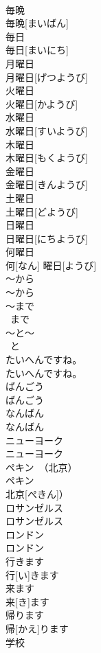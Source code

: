 \documentclass[8pt]{extreport}
\begin{document}
\begin{CJK}{UTF8}{min}
\\	毎晩	
\\	毎晩[まいばん]	
\\	毎日	
\\	毎日[まいにち]	
\\	月曜日	
\\	月曜日[げつようび]	
\\	火曜日	
\\	火曜日[かようび]	
\\	水曜日	
\\	水曜日[すいようび]	
\\	木曜日	
\\	木曜日[もくようび]	
\\	金曜日	
\\	金曜日[きんようび]	
\\	土曜日	
\\	土曜日[どようび]	
\\	日曜日	
\\	日曜日[にちようび]	
\\	何曜日	
\\	何[なん] 曜日[ようび]	
\\	～から	
\\	〜から	
\\	～まで	
\\	~まで	
\\	～と～	
\\	~と~	
\\	たいへんですね。	
\\	たいへんですね。	
\\	ばんごう	
\\	ばんごう	
\\	なんばん	
\\	なんばん	
\\	ニューヨーク	
\\	ニューヨーク	
\\	ペキン　（北京）	
\\	ペキン　
\\	北京[ぺきん]）	
\\	ロサンゼルス	
\\	ロサンゼルス	
\\	ロンドン	
\\	ロンドン	
\\	行きます	
\\	行[い]きます	
\\	来ます	
\\	来[き]ます	
\\	帰ります	
\\	帰[かえ]ります	
\\	学校	

\end{CJK}
\end{document}
